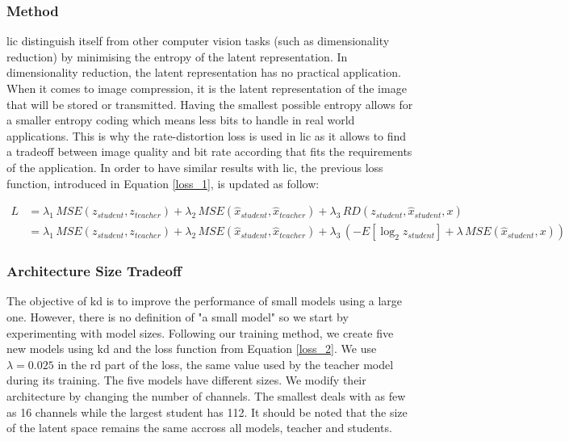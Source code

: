 \subsubsection{Method}
\acrshort{lic} distinguish itself from other computer vision tasks (such as dimensionality reduction) by minimising the entropy of the latent representation. In dimensionality reduction, the latent representation has no practical application. When it comes to image compression, it is the latent representation of the image that will be stored or transmitted. Having the smallest possible entropy allows for a smaller entropy coding which means less bits to handle in real world applications. This is why the rate-distortion loss is used in \acrshort{lic} as it allows to find a tradeoff between image quality and bit rate according that fits the requirements of the application. In order to have similar results with \acrshort{lic}, the previous loss function, introduced in Equation \eqref{loss_1}, is updated as follow:

\begin{align}
    L &= \lambda_{1}\, MSE(z_{student}, z_{teacher}) + \lambda_{2}\, MSE(\hat{x}_{student}, \hat{x}_{teacher}) + \lambda_{3}\, RD(z_{student}, \hat{x}_{student}, x)\label{loss_2}\\
      &= \lambda_{1}\, MSE(z_{student}, z_{teacher}) + \lambda_{2}\, MSE(\hat{x}_{student}, \hat{x}_{teacher}) + \lambda_{3}\, (-E[\log_{2}z_{student}] + \lambda\, MSE(\hat{x}_{student}, x)) \nonumber
\end{align}

\subsubsection{Architecture Size Tradeoff}
\label{architecture_size_tradeoff}
The objective of \acrshort{kd} is to improve the performance of small models using a large one. However, there is no definition of "a small model" so we start by experimenting with model sizes. Following our training method, we create five new models using \acrshort{kd} and the loss function from Equation \ref{loss_2}. We use \(\lambda = 0.025\) in the \acrshort{rd} part of the loss, the same value used by the teacher model during its training. The five models have different sizes. We modify their architecture by changing the number of channels. The smallest deals with as few as 16 channels while the largest student has 112. It should be noted that the size of the latent space remains the same accross all models, teacher and students.


